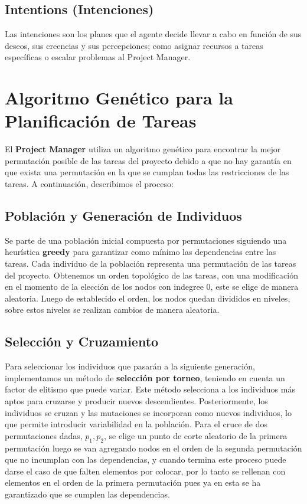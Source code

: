 \documentclass[a4paper, 12pt]{article}
\begin{document}
\subsection{Intentions (Intenciones)}
Las intenciones son los planes que el agente decide llevar a cabo en función de sus deseos, sus creencias y sus percepciones; como asignar recursos a tareas específicas o escalar problemas al Project Manager.

\section{Algoritmo Genético para la Planificación de Tareas}
El \textbf{Project Manager} utiliza un algoritmo genético para encontrar la mejor permutación posible de las tareas del proyecto debido a que no hay garant\'ia en que exista una permutación en la que se cumplan todas las restricciones de las tareas. A continuación, describimos el proceso:

\subsection{Población y Generación de Individuos}
Se parte de una población inicial compuesta por permutaciones siguiendo una heurística \textbf{greedy} para garantizar como m\'inimo las dependencias entre las tareas. Cada individuo de la población representa una permutación de las tareas del proyecto. Obtenemos un orden topol\'ogico de las tareas, con una modificaci\'on en el momento de la elecci\'on de los nodos con indegree $0$, este se elige de manera aleatoria. Luego de establecido el orden, los nodos quedan divididos en niveles, sobre estos niveles se realizan cambios de manera aleatoria.

\subsection{Selección y Cruzamiento}
Para seleccionar los individuos que pasarán a la siguiente generación, implementamos un método de \textbf{selección por torneo}, teniendo en cuenta un factor de elitismo que puede variar. Este método selecciona a los individuos más aptos para cruzarse y producir nuevos descendientes. Posteriormente, los individuos se cruzan y las mutaciones se incorporan como nuevos individuos, lo que permite introducir variabilidad en la población. Para el cruce de dos permutaciones dadas, $p_1, p_2$, se elige un punto de corte aleatorio de la primera permutación luego se van agregando nodos en el orden de la segunda permutaci\'on que no incumplan con las dependencias, y cuando termina este proceso puede darse el caso de que falten elementos por colocar, por lo tanto se rellenan con elementos en el orden de la primera permutación pues ya en esta se ha garantizado que se cumplen las dependencias.
\end{document}
